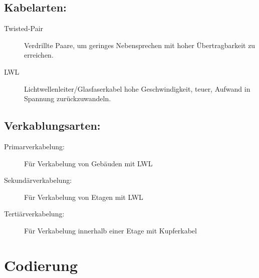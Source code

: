 \documentclass[12pt,a4paper]{article}
\begin{document}
		\subsection{Kabelarten:}
		\begin{description}
			\item[Twisted-Pair] Verdrillte Paare, um geringes Nebensprechen mit hoher Übertragbarkeit zu erreichen.
			\item[LWL] Lichtwellenleiter/Glasfaserkabel hohe Geschwindigkeit, teuer, Aufwand in Spannung zurückzuwandeln.
		\end{description}

		\subsection{Verkablungsarten:}
		\begin{description}
			\item[Primarverkabelung: ] Für Verkabelung von Gebäuden mit LWL
			\item[Sekundärverkabelung: ] Für Verkabelung von Etagen mit LWL
			\item[Tertiärverkabelung: ] Für Verkabelung innerhalb einer Etage mit Kupferkabel
		\end{description}

	\section{Codierung}
\end{document}
